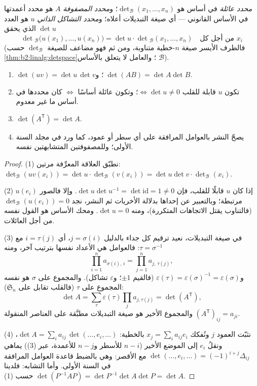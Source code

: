 \begin{definition}[المحددات]\label{def:b2:linalg:det}
\emph{محدد عائلة} في أساس هو
$\det_{\mathcal{B}}(x_1, \dots, x_n)$؛ و\emph{محدد المصفوفة}
$A$ هو محدد أعمدتها في الأساس القانوني
--- أي صيغة التبديلات أعلاه؛ و\emph{محدد التشاكل الذاتي}
$u$ هو العدد $\det u$ الذي يحقق
\[
\det{}_{\mathcal{B}}\bigl(u(x_1), \dots, u(x_n)\bigr)
= \det u \cdot \det{}_{\mathcal{B}}(x_1, \dots, x_n)
\quad \text{من أجل كل } x_i
\]
(فالطرف الأيسر صيغة $n$-خطية متناوبة، ومن ثم فهو مضاعف
للصيغة $\det_\mathcal{B}$ حسب \cref{thm:b2:linalg:detspace}؛ والعامل لا
يتعلق بالأساس $\mathcal{B}$).
\end{definition}

\begin{theorem}\label{thm:b2:linalg:detrules}
\begin{enumerate}
  \item $\det(uv) = \det u\,\det v$؛ و$\;\det(AB) = \det A \det B$.
  \item تكون $u$ قابلة للقلب $\iff \det u \neq 0$؛ وتكون عائلة أساسًا
        $\iff$ كان محددها في أساس ما غير معدوم.
  \item $\det(A^{\mathsf T}) = \det A$.
  \item يصحّ النشر بالعوامل المرافقة على أي سطر أو عمود، كما
        ورد في مجلد السنة الأولى؛ وللمصفوفتين المتشابهتين
         نفسه.
\end{enumerate}
\end{theorem}

\begin{proof}
(1) نطبّق العلاقة المعرِّفة مرتين:
$\det_{\mathcal B}(uv(x_i)) = \det u \cdot \det_{\mathcal
B}(v(x_i)) = \det u \det v \cdot \det_{\mathcal B}(x_i)$.

(2) إذا كان $u$ قابلًا للقلب، فإن $\det u \det u^{-1} = \det \mathrm{id} =
1 \neq 0$. وإلا فالصور $u(e_i)$ مرتبطة؛ وبالتعبير عن إحداها
بدلالة الأخريات ثم النشر، نجد $\det_{\mathcal B}(u(e_i)) = 0$
(فالتناوب يقتل الاتجاهات المتكررة)، ومنه $\det u = 0$. ومحك الأساس
هو القول نفسه من أجل العائلات.

(3) في صيغة التبديلات، نعيد ترقيم كل جداء بالدليل $j =
\sigma(i)$، أي $i = \tau(j)$ مع $\tau = \sigma^{-1}$: فالعوامل
هي الأعداد نفسها بترتيب آخر، ومنه
\[
\prod_{i=1}^{n} a_{\sigma(i),\,i} = \prod_{j=1}^{n}
a_{j,\,\tau(j)} ,
\]
و$\varepsilon(\tau) = \varepsilon(\sigma)^{-1} =
\varepsilon(\sigma)$ (فالقيم $\pm1$؛ و$\varepsilon$
تشاكل). والمجموع على $\sigma$ هو نفسه المجموع على
$\tau$ (فالقلب تقابل على $\mathfrak{S}_n$):
\[
\det A = \sum_{\tau}\varepsilon(\tau)\prod_j a_{j,\tau(j)}
= \det(A^{\mathsf T}),
\]
والمجموع الأخير هو صيغة التبديلات مطبَّقة على
العناصر المنقولة $(A^{\mathsf T})_{ij} = a_{ji}$.

(4) نثبّت العمود $j$ ونُفكك $x_j = \sum_i a_{ij} e_i$
بالخطية: $\det A = \sum_i a_{ij}\, \det(\dots, e_i, \dots)$، ونقلُ
$e_i$ إلى الموضع الأخير ($n - i$  للأسطر
و$n - j$ للأعمدة، عبر (3)) يماهي $\det(\dots, e_i, \dots) =
(-1)^{i+j}\Delta_{ij}$ مع الأقصر: وهي بالضبط قاعدة العوامل المرافقة
في السنة الأولى. وأما التشابه: فلدينا $\det(P^{-1}AP) = \det P^{-1}\det A \det P =
\det A$ حسب (1).
\end{proof}

